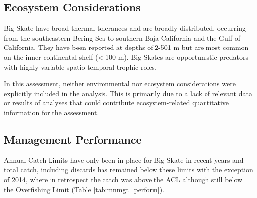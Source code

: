 \documentclass[12pt,]{article}
\begin{document}
\FloatBarrier

\newpage

\hypertarget{ecosystem-considerations}{%
\subsection*{Ecosystem Considerations}\label{ecosystem-considerations}}

Big Skate have broad thermal tolerances and are broadly distributed,
occurring from the southeastern Bering Sea to southern Baja California
and the Gulf of California. They have been reported at depths of 2-501 m
but are most common on the inner continental shelf (\textless{} 100 m).
Big Skates are opportunistic predators with highly variable
spatio-temporal trophic roles.

In this assessment, neither environmental nor ecosystem considerations
were explicitly included in the analysis. This is primarily due to a
lack of relevant data or results of analyses that could contribute
ecosystem-related quantitative information for the assessment.

\hypertarget{management-performance}{%
\subsection*{Management Performance}\label{management-performance}}

Annual Catch Limits have only been in place for Big Skate in recent
years and total catch, including discards has remained below these
limits with the exception of 2014, where in retrospect the catch was
above the ACL although still below the Overfishing Limit (Table
\ref{tab:mnmgt_perform}).
\end{document}
